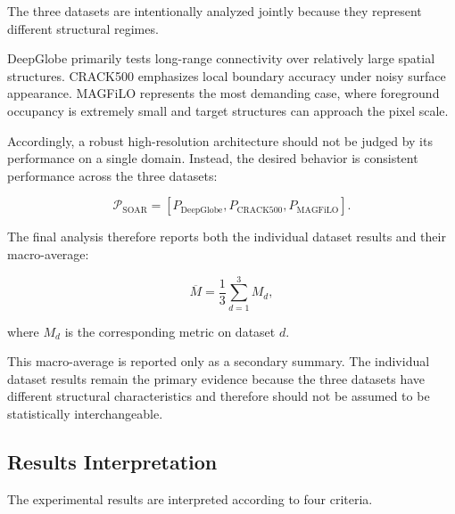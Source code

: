 \documentclass[11pt,a4paper]{article}
\begin{document}
The three datasets are intentionally analyzed jointly because they represent 
different structural regimes.

DeepGlobe primarily tests long-range connectivity over relatively large 
spatial structures. CRACK500 emphasizes local boundary accuracy under noisy 
surface appearance. MAGFiLO represents the most demanding case, where 
foreground occupancy is extremely small and target structures can approach 
the pixel scale.

Accordingly, a robust high-resolution architecture should not be judged by 
its performance on a single domain. Instead, the desired behavior is 
consistent performance across the three datasets:

\begin{equation}
\mathcal{P}_{\mathrm{SOAR}}
=
\left[
P_{\mathrm{DeepGlobe}},
P_{\mathrm{CRACK500}},
P_{\mathrm{MAGFiLO}}
\right].
\end{equation}

The final analysis therefore reports both the individual dataset results and 
their macro-average:

\begin{equation}
\overline{M}
=
\frac{1}{3}
\sum_{d=1}^{3} M_d,
\end{equation}

where $M_d$ is the corresponding metric on dataset $d$.

This macro-average is reported only as a secondary summary. The individual 
dataset results remain the primary evidence because the three datasets have 
different structural characteristics and therefore should not be assumed to 
be statistically interchangeable.


\subsection{Results Interpretation}

The experimental results are interpreted according to four criteria.
\end{document}
